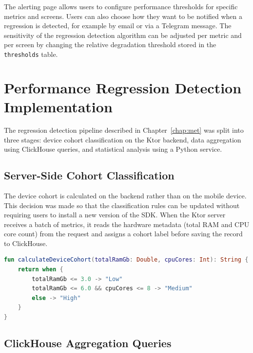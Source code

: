 The alerting page allows users to configure performance thresholds for specific metrics and screens. Users can also choose how they want to be notified when a regression is detected, for example by email or via a Telegram message. The sensitivity of the regression detection algorithm can be adjusted per metric and per screen by changing the relative degradation threshold stored in the \texttt{thresholds} table.

\section{Performance Regression Detection Implementation}
\label{sec:regression_impl}

The regression detection pipeline described in Chapter~\ref{chap:met} was split into three stages: device cohort classification on the Ktor backend, data aggregation using ClickHouse queries, and statistical analysis using a Python service.

\subsection{Server-Side Cohort Classification}

The device cohort is calculated on the backend rather than on the mobile device. This decision was made so that the classification rules can be updated without requiring users to install a new version of the SDK. When the Ktor server receives a batch of metrics, it reads the hardware metadata (total RAM and CPU core count) from the request and assigns a cohort label before saving the record to ClickHouse.

\begin{lstlisting}[language=Kotlin, caption={Device cohort classification}]
fun calculateDeviceCohort(totalRamGb: Double, cpuCores: Int): String {
    return when {
        totalRamGb <= 3.0 -> "Low"
        totalRamGb <= 6.0 && cpuCores <= 8 -> "Medium"
        else -> "High"
    }
}
\end{lstlisting}

\subsection{ClickHouse Aggregation Queries}

